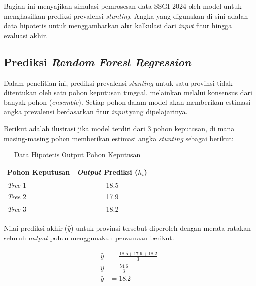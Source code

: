 Bagian ini menyajikan simulasi pemrosesan data SSGI 2024 oleh model untuk menghasilkan prediksi prevalensi \textit{stunting}. Angka yang digunakan di sini adalah data hipotetis untuk menggambarkan alur kalkulasi dari \textit{input} fitur hingga evaluasi akhir.

\subsection{Prediksi \textit{Random Forest Regression}}

Dalam penelitian ini, prediksi prevalensi \textit{stunting} untuk satu provinsi tidak ditentukan oleh satu pohon keputusan tunggal, melainkan melalui konsensus dari banyak pohon (\textit{ensemble}). Setiap pohon dalam model akan memberikan estimasi angka prevalensi berdasarkan fitur \textit{input} yang dipelajarinya.

Berikut adalah ilustrasi jika model terdiri dari 3 pohon keputusan, di mana masing-masing pohon memberikan estimasi angka \textit{stunting} sebagai berikut:

\begin{table}[H]
    \centering
    \renewcommand{\arraystretch}{1.3}
    \caption{Data Hipotetis Output Pohon Keputusan}
    \label{tab:rf_output_dummy}
    \begin{tabular}{lc}
    \toprule
    \textbf{Pohon Keputusan} & \textbf{\textit{Output} Prediksi ($h_i$)} \\
    \midrule
    \textit{Tree} 1 & 18.5 \\
    \textit{Tree} 2 & 17.9 \\
    \textit{Tree} 3 & 18.2 \\
    \bottomrule
    \end{tabular}
\end{table}

Nilai prediksi akhir ($\hat{y}$) untuk provinsi tersebut diperoleh dengan merata-ratakan seluruh \textit{output} pohon menggunakan persamaan berikut:

\par\vspace{0.2cm}
\begin{align*}
    \hat{y} &= \frac{18.5 + 17.9 + 18.2}{3} \\[0.3cm]
    \hat{y} &= \frac{54.6}{3} \\[0.3cm]
    \hat{y} &= \mathbf{18.2}
\end{align*}
\par\vspace{0.5cm}

